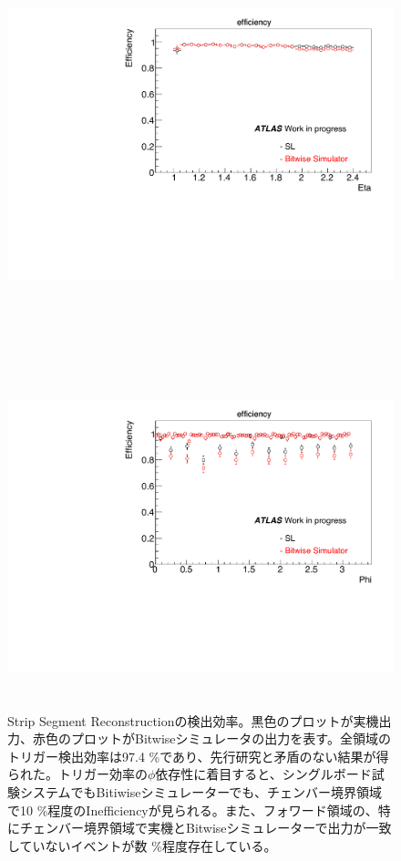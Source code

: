 \begin{figure}
\begin{minipage}[b]{\linewidth}
\centering
\includegraphics[height=10cm]{fig/Test/A_SM_strip_eta.pdf}
\end{minipage}\\
\begin{minipage}[b]{\linewidth}
\centering
\includegraphics[height=10cm]{fig/Test/A_SM_strip_phi.pdf}
\end{minipage}%
\caption[Strip Segment Reconstructionの検出効率]{Strip Segment Reconstructionの検出効率。黒色のプロットが実機出力、赤色のプロットがBitwiseシミュレータの出力を表す。全領域のトリガー検出効率は97.4 \%であり、先行研究と矛盾のない結果が得られた。トリガー効率の$\phi$依存性に着目すると、シングルボード試験システムでもBitiwiseシミュレーターでも、チェンバー境界領域で10 \%程度のInefficiencyが見られる。また、フォワード領域の、特にチェンバー境界領域で実機とBitwiseシミュレーターで出力が一致していないイベントが数 \%程度存在している。}
\label{SM_A_strip}
\end{figure}



